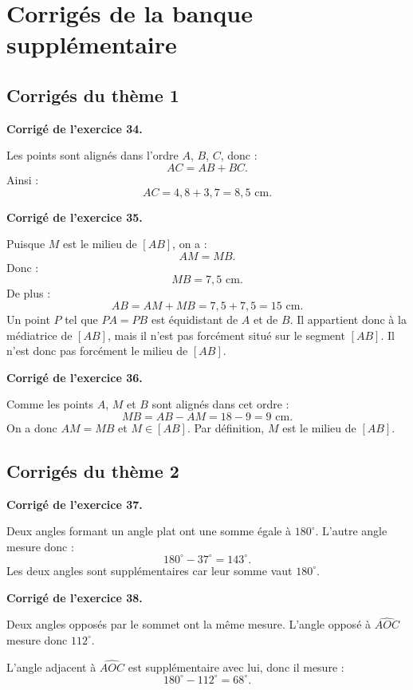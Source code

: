 \documentclass[11pt,a4paper]{article}
\newcounter{exercice}
\newenvironment{corrige}[1][]
{\par\medskip\noindent\textbf{Corrigé de l'exercice #1.}\par\smallskip}
{\medskip}
\begin{document}
\clearpage
\section{Corrigés de la banque supplémentaire}

\subsection*{Corrigés du thème 1}

\begin{corrige}[34]
Les points sont alignés dans l'ordre $A$, $B$, $C$, donc :
\[
AC=AB+BC.
\]
Ainsi :
\[
AC=4,8+3,7=8,5\text{ cm}.
\]
\end{corrige}

\begin{corrige}[35]
Puisque $M$ est le milieu de $[AB]$, on a :
\[
AM=MB.
\]
Donc :
\[
MB=7,5\text{ cm}.
\]
De plus :
\[
AB=AM+MB=7,5+7,5=15\text{ cm}.
\]
Un point $P$ tel que $PA=PB$ est équidistant de $A$ et de $B$. Il appartient donc à la médiatrice de $[AB]$, mais il n'est pas forcément situé sur le segment $[AB]$. Il n'est donc pas forcément le milieu de $[AB]$.
\end{corrige}

\begin{corrige}[36]
Comme les points $A$, $M$ et $B$ sont alignés dans cet ordre :
\[
MB=AB-AM=18-9=9\text{ cm}.
\]
On a donc $AM=MB$ et $M\in[AB]$. Par définition, $M$ est le milieu de $[AB]$.
\end{corrige}

\subsection*{Corrigés du thème 2}

\begin{corrige}[37]
Deux angles formant un angle plat ont une somme égale à $180^\circ$. L'autre angle mesure donc :
\[
180^\circ-37^\circ=143^\circ.
\]
Les deux angles sont supplémentaires car leur somme vaut $180^\circ$.
\end{corrige}

\begin{corrige}[38]
Deux angles opposés par le sommet ont la même mesure. L'angle opposé à $\widehat{AOC}$ mesure donc $112^\circ$.

L'angle adjacent à $\widehat{AOC}$ est supplémentaire avec lui, donc il mesure :
\[
180^\circ-112^\circ=68^\circ.
\]
\end{corrige}
\end{document}

